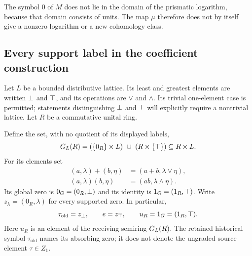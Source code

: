 The symbol $0$ of $M$ does not lie in the domain of the prismatic
logarithm, because that domain consists of units. The map $\mu$ therefore
does not by itself give a nonzero logarithm or a new cohomology class.

\subsection{Every support label in the coefficient construction}
Let $L$ be a bounded distributive lattice. Its least and greatest
elements are written $\bot$ and $\top$, and its operations are $\vee$
and $\wedge$. Its trivial one-element case is permitted; statements
distinguishing $\bot$ and $\top$ will explicitly require a nontrivial
lattice. Let $R$ be a commutative unital ring.

\begin{definition}\label{BLR-def:GL}
Define the set, with no quotient of its displayed labels,
\[
 \GL(R)=(\{0_R\}\times L)\ \cup\ (R\times\{\topL\})
 \subseteq R\times L.
\]
For its elements set
\begin{align}
 (a,\lambda)+(b,\eta)&=(a+b,\lambda\vee\eta),\label{BLR-eq:GL-add}\\
 (a,\lambda)(b,\eta)&=(ab,\lambda\wedge\eta).\label{BLR-eq:GL-mult}
\end{align}
Its global zero is $0_G=(0_R,\bot)$ and its identity is
$1_G=(1_R,\top)$. Write $z_\lambda=(0_R,\lambda)$ for every supported
zero. In particular,
\[
 \tau_{\mathrm{old}}=z_{\bot},\qquad
 e=z_{\top},\qquad u_R=1_G=(1_R,\top).
\]
Here $u_R$ is an element of the receiving semiring $G_L(R)$.
The retained historical symbol $\tau_{\mathrm{old}}$ names its absorbing
zero; it does not denote the ungraded source element $\tau\in Z_1$.
\end{definition}

